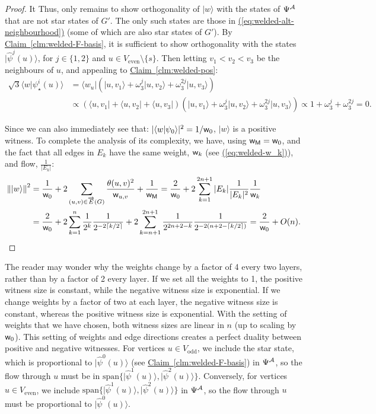 \documentclass{article}
\newcommand{\eq}[1]{\hyperref[eq:#1]{(\ref*{eq:#1})}}
\newcommand{\clm}[1]{\hyperref[clm:#1]{Claim~\ref*{clm:#1}}}
\def\ket#1{{\lvert}#1\rangle}
\def\bra#1{{\langle}#1\rvert}
\renewcommand{\>}{\rangle}
\newcommand{\<}{\langle}
\renewcommand{\(}{\left(}
\renewcommand{\)}{\right)}
\def\braket#1#2{{{\langle}#1\vert}#2\rangle}
\def\norm#1{\left\| #1 \right\|}
\def\w{{\sf w}}
\begin{document}
\begin{proof}
It Thus, only remains to show orthogonality of $\ket{w}$ with the states of $\Psi^{\cal A}$ that are not star states of $G'$. The only such states are those in \eq{welded-alt-neighbourhood} (some of which are also star states of $G'$). By \clm{welded-F-basis}, it is sufficient to show orthogonality with the states $\ket{\widehat{\psi}^j(u)}$, for $j\in\{1,2\}$ and $u\in V_{\mathrm{even}}\setminus\{s\}$. 
Then letting $v_1<v_2<v_3$ be the neighbours of $u$, and appealing to \clm{welded-pos}:
\begin{align*}
\sqrt{3}\braket{w}{\psi_\star^i(u)}
&= \bra{w_u}\left(\ket{u,v_1}+\omega_3^j\ket{u,v_2}+\omega_3^{2j}\ket{u,v_3}\right)\\
&\propto \left(\bra{u,v_1}+\bra{u,v_2}+\bra{u,v_3} \right)\left(\ket{u,v_1}+\omega_3^j\ket{u,v_2}+\omega_3^{2j}\ket{u,v_3}\right)
\propto 1+\omega_3^j+\omega_3^{2j} = 0.
\end{align*}

Since we can also immediately see that:
$|\braket{w}{\psi_0}|^2  = {1}/{\w_0}$,
$\ket{w}$ is a positive witness. To complete the analysis of its complexity, we have, using $\w_{\sf M}=\w_0$, and the fact that all edges in $E_k$ have the same weight, $\w_k$ (see \eq{welded-w_k}), and flow, $\frac{1}{|E_k|}$:
\begin{align*}
\norm{\ket{w}}^2 &= \frac{1}{\w_0}+ 2\sum_{(u,v)\in\overrightarrow{E}(G)}\frac{\theta(u,v)^2}{\w_{u,v}}+\frac{1}{\w_{\sf M}}
=\frac{2}{\w_0} + 2\sum_{k=1}^{2n+1}|E_k|\frac{1}{|E_k|^2}\frac{1}{\w_k}\\
&= \frac{2}{\w_0}+2\sum_{k=1}^n\frac{1}{2^k}\frac{1}{2^{-2\lceil k/2\rceil}} + 2\sum_{k=n+1}^{2n+1}\frac{1}{2^{2n+2-k}}\frac{1}{2^{-2(n+2-\lceil k/2\rceil)}}  
= \frac{2}{\w_0}+O(n).\qedhere
\end{align*}
\end{proof}

\begin{remark}\label{rmk:flow-duality}
The reader may wonder why the weights change by a factor of 4 every two layers, rather than by a factor of 2 every layer. If we set all the weights to 1, the positive witness size is constant, while the negative witness size is exponential. If we change weights by a factor of two at each layer, the negative witness size is constant, whereas the positive witness size is exponential. With the setting of weights that we have chosen, both witness sizes are linear in $n$ (up to scaling by $\w_0$). This setting of weights and edge directions creates a perfect duality between positive and negative witnesses. For vertices $u\in V_{\mathrm{odd}}$, we include the star state, which is proportional to $\ket{\widehat{\psi}^0(u)}$ (see \clm{welded-F-basis}) in $\Psi^{\cal A}$, so the flow through $u$ must be in $\mathrm{span}\{\ket{\widehat{\psi}^1(u)},\ket{\widehat{\psi}^2(u)}\}$. Conversely, for vertices $u\in V_{\mathrm{even}}$, we include $\mathrm{span}\{\ket{\widehat{\psi}^1(u)},\ket{\widehat{\psi}^2(u)}\}$ in $\Psi^{\cal A}$, so the flow through $u$ must be proportional to $\ket{\widehat{\psi}^0(u)}$.
\end{remark}
\end{document}
